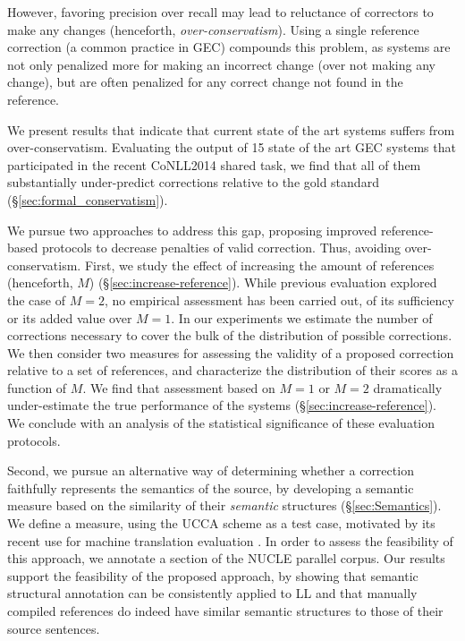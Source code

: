 \documentclass[letter,11pt]{article}
\begin{document}
	However, favoring precision over recall may lead to reluctance of correctors to make any changes (henceforth, {\it over-conservatism}).
	Using a single reference correction (a common practice in GEC) compounds this problem,
	as systems are not only penalized more for making an incorrect change (over not making
	any change), but are often penalized for any correct change not found in the reference.
	
	We present results that indicate that current state of the art systems suffers
	from over-conservatism. Evaluating the output of 15 state
	of the art GEC systems that participated
	in the recent CoNLL2014 shared task, we find that all of them
	substantially under-predict corrections relative to the gold standard
	(\S\ref{sec:formal_conservatism}). 
	
	We pursue two approaches to address this gap, proposing
	improved reference-based protocols to decrease penalties of valid correction. Thus, avoiding over-conservatism.
	First, we study the effect of increasing the amount of references
	(henceforth, $M$) (\S\ref{sec:increase-reference}).
	While previous evaluation explored the case of $M=2$,
	no empirical assessment has been carried out, of its sufficiency
	or its added value over $M=1$.
	In our experiments we estimate the number of corrections necessary
	to cover the bulk of the distribution of possible corrections.
	We then consider two measures for
	assessing the validity of a proposed correction relative to a set of references,
	and characterize the distribution of their scores as a function of $M$.
	We find that assessment based on $M=1$ or $M=2$ dramatically under-estimate
	the true performance of the systems (\S\ref{sec:increase-reference}). 
	We conclude with an analysis of
	the statistical significance of these evaluation protocols.
	
	Second, we pursue an alternative way of determining whether a correction faithfully
	represents the semantics of the source, by developing a semantic measure based
	on the similarity of their {\it semantic} structures (\S\ref{sec:Semantics}).
	We define a measure, using the UCCA scheme \cite{abend2013universal} as a
	test case, motivated by its recent use for machine translation
	evaluation \cite{birch2016hume}.
	In order to assess the feasibility of this approach, we annotate a
	section of the NUCLE \cite{dahlmeier2013building}
	parallel corpus. Our results support the feasibility of the proposed approach,
	by showing that semantic structural annotation can be consistently applied
	to LL and that manually compiled references do indeed
	have similar semantic structures to those of their source sentences.
	
\end{document}
